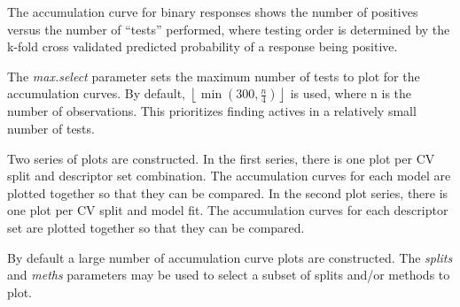The accumulation curve for binary responses shows the number of
positives versus the number of ``tests'' performed, where testing order
is determined by the k-fold cross validated predicted probability of a
response being positive.

The \emph{max.select} parameter sets the maximum number of tests to plot
for the accumulation curves. By default,
\(\left \lfloor{{\min(300, \frac{n}{4})}}\right \rfloor\) is used, where
n is the number of observations. This prioritizes finding actives in a
relatively small number of tests.

Two series of plots are constructed. In the first series, there is one
plot per CV split and descriptor set combination. The accumulation
curves for each model are plotted together so that they can be compared.
In the second plot series, there is one plot per CV split and model fit.
The accumulation curves for each descriptor set are plotted together so
that they can be compared.

By default a large number of accumulation curve plots are constructed.
The \emph{splits} and \emph{meths} parameters may be used to select a
subset of splits and/or methods to plot.

